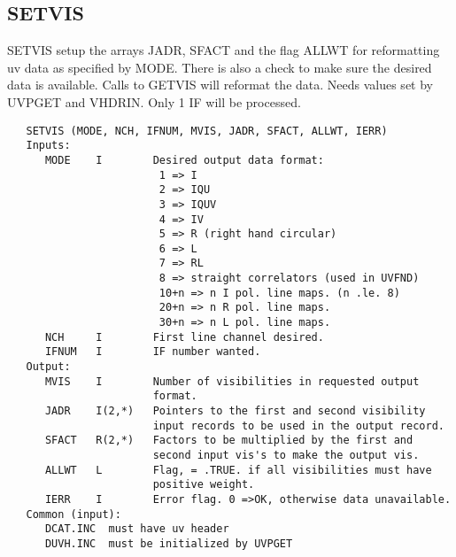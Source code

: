 \subsection{SETVIS}
SETVIS setup the arrays JADR, SFACT and the flag ALLWT for
reformatting uv data as specified by MODE.  There is also a check to
make sure the desired data is available.  Calls to GETVIS will
reformat the data.  Needs values set by UVPGET and VHDRIN.
Only 1 IF will be processed.
\begin{verbatim}
   SETVIS (MODE, NCH, IFNUM, MVIS, JADR, SFACT, ALLWT, IERR)
   Inputs:
      MODE    I        Desired output data format:
                        1 => I
                        2 => IQU
                        3 => IQUV
                        4 => IV
                        5 => R (right hand circular)
                        6 => L
                        7 => RL
                        8 => straight correlators (used in UVFND)
                        10+n => n I pol. line maps. (n .le. 8)
                        20+n => n R pol. line maps.
                        30+n => n L pol. line maps.
      NCH     I        First line channel desired.
      IFNUM   I        IF number wanted.
   Output:
      MVIS    I        Number of visibilities in requested output
                       format.
      JADR    I(2,*)   Pointers to the first and second visibility
                       input records to be used in the output record.
      SFACT   R(2,*)   Factors to be multiplied by the first and
                       second input vis's to make the output vis.
      ALLWT   L        Flag, = .TRUE. if all visibilities must have
                       positive weight.
      IERR    I        Error flag. 0 =>OK, otherwise data unavailable.
   Common (input):
      DCAT.INC  must have uv header
      DUVH.INC  must be initialized by UVPGET
\end{verbatim}

